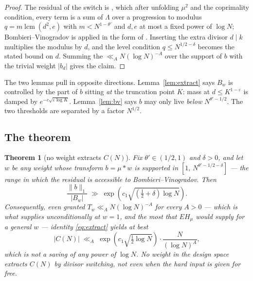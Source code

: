 \documentclass[11pt,a4paper]{article}
\theoremstyle{plain}
\newtheorem{theorem}{Theorem}
\theoremstyle{definition}
\theoremstyle{remark}
\DeclareMathOperator{\lcm}{lcm}
\begin{document}
\begin{proof}
The residual of the switch is \cite[eq.~(16)]{P1}, which after unfolding
$\mu^2$ and the coprimality condition, every term is a sum of
$\Lambda$ over a progression to modulus $q=m\lcm(d^2,e)$ with
$m<N^{1-\theta'}$ and $d,e$ at most a fixed power of $\log N$;
Bombieri--Vinogradov is applied in the form of \cite{MoV}.
Inserting the extra divisor $d\mid k$ multiplies the modulus by $d$,
and the level condition $q\le N^{1/2-\delta}$ becomes the stated
bound on $d$. Summing the $\ll_AN(\log N)^{-A}$ over the support of
$b$ with the trivial weight $|b_d|$ gives the claim.
\end{proof}

The two lemmas pull in opposite directions. Lemma~\ref{lem:extract}
says $B_w$ is controlled by the part of $b$ sitting \emph{at} the
truncation point $K$: mass at $d\le K^{1-\varepsilon}$ is damped by
$e^{-c\sqrt{\varepsilon\log K}}$. Lemma~\ref{lem:bv} says $b$ may only
live \emph{below} $N^{\theta'-1/2}$. The two thresholds are separated
by a factor $N^{1/2}$.

\subsection{The theorem}

\begin{theorem}[no weight extracts $C(N)$]\label{thm:D}
Fix $\theta'\in(1/2,1)$ and $\delta>0$, and let $w$ be any weight
whose transform $b=\mu*w$ is supported in
$[1,\,N^{\theta'-1/2-\delta}]$ --- the range in which the residual is
accessible to Bombieri--Vinogradov. Then
\begin{equation}\label{eq:loss}
  \frac{\|b\|_1}{|B_w|}\;\gg\;
   \exp\!\left(c_1\sqrt{(\tfrac12+\delta)\log N}\right).
\end{equation}
Consequently, \emph{even granted} $T_w\ll_A N(\log N)^{-A}$ for every
$A>0$ --- which is what \cite[Thm.~1]{P1} supplies unconditionally at
$w=1$, and the most that $EH_\mu$ would supply for a general $w$ ---
identity \eqref{eq:extract} yields at best
\[
  |C(N)|\;\ll_A\;\exp\!\left(c_1\sqrt{\tfrac12\log N}\right)
   \cdot\frac{N}{(\log N)^{A}},
\]
which is not a saving of any power of $\log N$. No weight in the
design space extracts $C(N)$ by divisor switching, not even when the
hard input is given for free.
\end{theorem}
\end{document}
